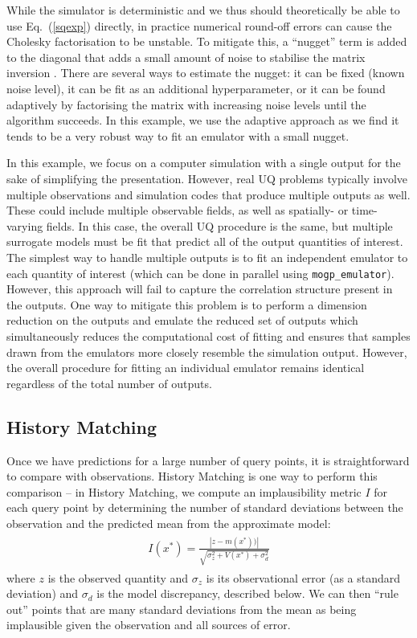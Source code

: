 \documentclass[openacc]{rstransa}%
\begin{document}
While the simulator is deterministic and we thus should theoretically be able to use Eq.~(\ref{sqexp})
directly, in practice numerical round-off errors can cause the Cholesky factorisation to be
unstable. To mitigate this, a ``nugget'' term is added to the diagonal that adds a small amount
of noise to stabilise the matrix inversion \cite{nugget}. There are several ways to estimate the nugget: it can
be fixed (known noise level), it can be fit as an additional hyperparameter, or it can be found
adaptively by factorising the matrix with increasing noise levels until the algorithm succeeds.
In this example, we use the adaptive approach as we find it tends to be a very robust way to fit an
emulator with a small nugget.

In this example, we focus on a computer simulation with a single output for
the sake of simplifying the presentation. However, real UQ problems typically
involve multiple observations and simulation codes that produce multiple
outputs as well. These could include multiple observable fields, as well as
spatially- or time-varying fields. In this case, the overall UQ procedure
is the same, but multiple surrogate models must be fit that predict all of
the output quantities of interest. The simplest way to handle multiple
outputs is to fit an independent emulator to each quantity of interest
(which can be done in parallel using \texttt{mogp\_emulator}). However,
this approach will fail to capture the correlation structure present in
the outputs. One way to mitigate this problem is to perform a dimension
reduction on the outputs and emulate the reduced set of outputs
\cite{dimreduction} which simultaneously reduces the computational cost
of fitting and ensures that samples drawn from the emulators more closely
resemble the simulation output. However, the overall procedure for fitting
an individual emulator remains identical regardless of the total number
of outputs.

\subsection{History Matching}

Once we have predictions for a large number of query points, it is straightforward to compare with observations.
History Matching is one way to perform this comparison \cite{histmatch} -- in History Matching, we compute an implausibility
metric $I$ for each query point by determining the number of standard deviations between the observation and the
predicted mean from the approximate model:
\begin{align}\label{implaus}
\begin{split}
I(x^*) = \frac{|z - m(x^*))|}{\sqrt{\sigma_z^2+V(x^*)+\sigma_d^2}}
\end{split}
\end{align}
where $z$ is the observed quantity and $\sigma_z$ is its observational error (as a standard deviation) and
$\sigma_d$ is the model discrepancy, described below. We can then ``rule out'' points that are many standard deviations from the mean as being implausible given the observation and all sources of error.
\end{document}
